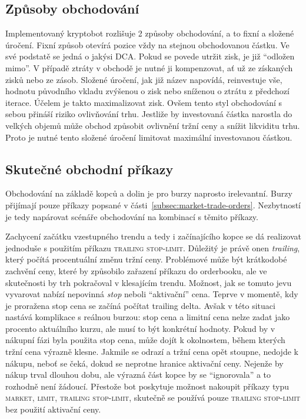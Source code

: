 \subsection{Způsoby obchodování}
Implementovaný kryptobot rozlišuje 2 způsoby obchodování, a to fixní a složené úročení. Fixní způsob otevírá pozice vždy na stejnou obchodovanou částku. Ve své podstatě se jedná o jakýsi DCA. Pokud se
povede utržit zisk, je již \enquote{odložen mimo}. V případě ztráty v obchodě je nutné ji kompenzovat, ať už ze získaných zisků nebo ze zásob.
Složené úročení, jak již název napovídá, reinvestuje vše, hodnotu původního vkladu zvýšenou o zisk nebo sníženou o ztrátu z předchozí iterace.
Účelem je takto maximalizovat zisk. Ovšem tento styl obchodování s sebou přináší riziko ovlivňování trhu. Jestliže
by investovaná částka narostla do velkých objemů může obchod způsobit ovlivnění tržní ceny a snížit likviditu trhu. Proto je nutné tento složené úročení limitovat maximální investovanou částkou.


\subsection{Skutečné obchodní příkazy}
Obchodování na základě kopců a dolin je pro burzy naprosto irelevantní. Burzy přijímají pouze příkazy popsané v části~\ref{subsec:market-trade-orders}. Nezbytností je tedy napárovat scénáře
obchodování na kombinací s těmito příkazy.

Zachycení začátku vzestupného trendu a tedy i začínajícího kopce se dá realizovat jednoduše s použitím příkazu \textsc{trailing stop-limit}. Důležitý
je právě onen \emph{trailing}, který počítá procentuální změnu tržní ceny. Problémové může být krátkodobé zachvění ceny, které by způsobilo zařazení příkazu do orderbooku, ale ve skutečnosti
by trh pokračoval v klesajícím trendu. Možnost, jak se tomuto jevu vyvarovat nabízí nepovinná \emph{stop} neboli \enquote{aktivační} cena. Teprve v momentě, kdy je proražena stop cena se začíná počítat trailing
delta. Avšak v této situaci nastává komplikace s reálnou burzou: stop cena a limitní cena nelze zadat jako procento aktuálního kurzu, ale musí to být konkrétní hodnoty. Pokud by v nákupní fázi
byla použita stop cena, může dojít k okolnostem, během kterých tržní cena výrazně klesne. Jakmile se odrazí a tržní cena opět stoupne, nedojde k nákupu, neboť se čeká, dokud se neprotne hranice
aktivační ceny. Nejenže by nákup trval dlouhou dobu, ale výrazná část kopce by se \enquote{ignorovala} a to rozhodně není žádoucí. Přestože bot poskytuje možnost nakoupit příkazy typu \textsc{market,
    limit, trailing stop-limit}, skutečně se používá pouze \textsc{trailing stop-limit} bez použití aktivační ceny.

